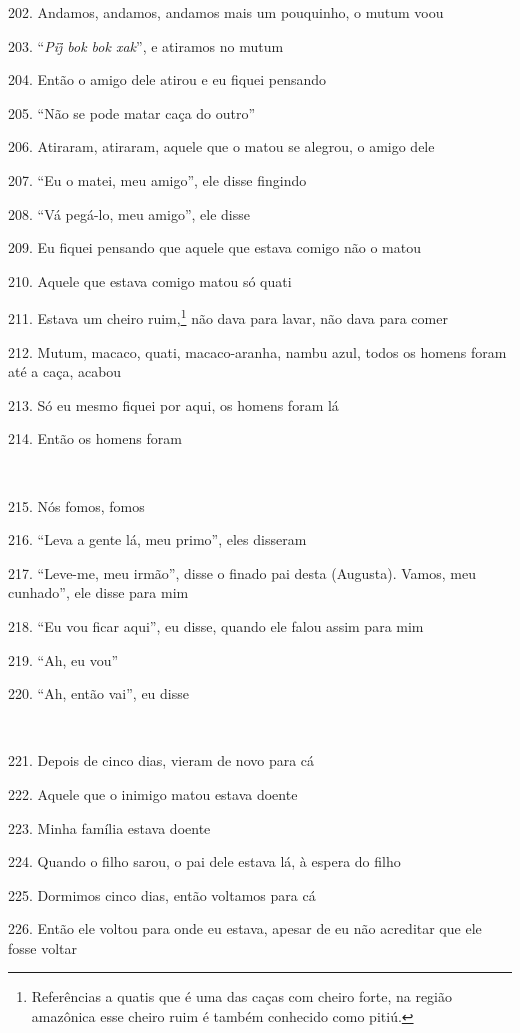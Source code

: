 202. Andamos, andamos, andamos mais um pouquinho, o mutum voou

203. ``\emph{Pij̃ bok bok xak}'', e atiramos no mutum

204. Então o amigo dele atirou e eu fiquei pensando

205. ``Não se pode matar caça do outro''

206. Atiraram, atiraram, aquele que o matou se alegrou, o amigo dele

207. ``Eu o matei, meu amigo'', ele disse fingindo

208. ``Vá pegá-lo, meu amigo'', ele disse

209. Eu fiquei pensando que aquele que estava comigo não o matou

210. Aquele que estava comigo matou só quati

211. Estava um cheiro ruim,\footnote{Referências a quatis que é uma das
  caças com cheiro forte, na região amazônica esse cheiro ruim é também
  conhecido como pitiú.} não dava para lavar, não dava para comer

212. Mutum, macaco, quati, macaco-aranha, nambu azul, todos os homens
foram até a caça, acabou

213. Só eu mesmo fiquei por aqui, os homens foram lá

214. Então os homens foram

~

215. Nós fomos, fomos

216. ``Leva a gente lá, meu primo'', eles disseram

217. ``Leve-me, meu irmão'', disse o finado pai desta (Augusta).  Vamos,
meu cunhado'', ele disse para mim

218. ``Eu vou ficar aqui'', eu disse, quando ele falou assim para mim

219. ``Ah, eu vou''

220. ``Ah, então vai'', eu disse

~

221. Depois de cinco dias, vieram de novo para cá

222. Aquele que o inimigo matou estava doente

223. Minha família estava doente

224. Quando o filho sarou, o pai dele estava lá, à espera do filho

225. Dormimos cinco dias, então voltamos para cá

226. Então ele voltou para onde eu estava, apesar de eu não acreditar que
ele fosse voltar

